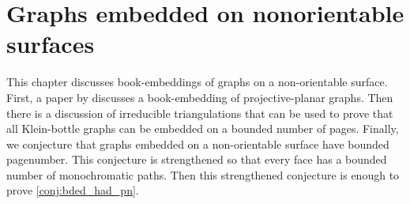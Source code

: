 \chapter{Graphs embedded on nonorientable surfaces}\label{chap:nonorientable}

This chapter discusses book-embeddings of graphs on a non-orientable surface. First, a paper by \textcite{nakamotoBookEmbeddingProjectiveplanar2015} discusses a book-embedding of projective-planar graphs. Then there is a discussion of irreducible triangulations that can be used to prove that all Klein-bottle graphs can be embedded on a bounded number of pages. Finally, we conjecture that graphs embedded on a non-orientable surface have bounded pagenumber. This conjecture is strengthened so that every face has a bounded number of monochromatic paths. Then this strengthened conjecture is enough to prove \cref{conj:bded_had_pn}.






